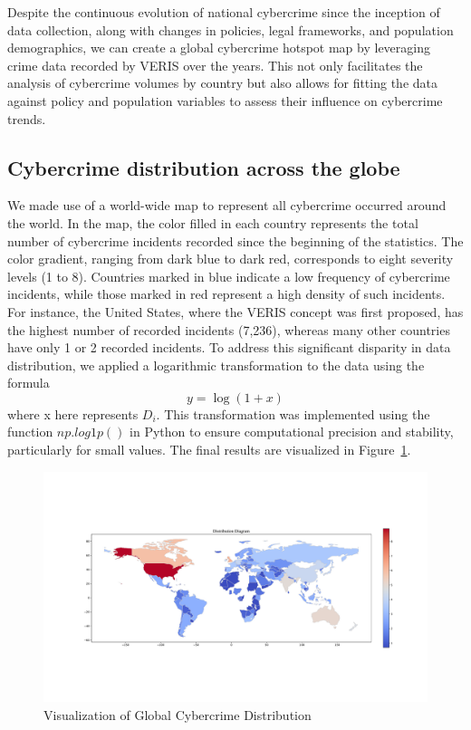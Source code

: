 
Despite the continuous evolution of national cybercrime since the inception of data collection,
along with changes in policies, legal frameworks, and population demographics,
we can create a global cybercrime hotspot map by leveraging crime data recorded by VERIS over the years.
This not only facilitates the analysis of cybercrime volumes by country
but also allows for fitting the data against policy and population variables to assess their influence on cybercrime trends.
\subsection{Cybercrime distribution across the globe}\label{subsec:building-the-hotspot-map} %
	We made use of a world-wide map to represent all cybercrime occurred around the world.
	In the map, the color filled in each country represents the total number of cybercrime incidents recorded since the beginning of the statistics.
	The color gradient, ranging from dark blue to dark red, corresponds to eight severity levels (1 to 8).
	Countries marked in blue indicate a low frequency of cybercrime incidents, while those marked in red represent a high density of such incidents.
	For instance, the United States, where the VERIS concept was first proposed, has the highest number of recorded incidents (7,236),
	whereas many other countries have only 1 or 2 recorded incidents.
	To address this significant disparity in data distribution, we applied a logarithmic transformation to the data using the formula
	\begin{equation}
		y=\log(1+x)\label{eq:3-1-1}
	\end{equation}
	where x here represents $D_i$.
	This transformation was implemented using the function \( np.log1p() \)
	in Python to ensure computational precision and stability, particularly for small values.
	The final results are visualized in Figure~\ref{fig:crime-distribution}.
	\begin{figure}[htb]
		\centering
		\includegraphics[width=1\linewidth]{../rsrc/distributions/Crime_distribution}
		\caption{Visualization of Global Cybercrime Distribution}\label{fig:crime-distribution}
	\end{figure}
